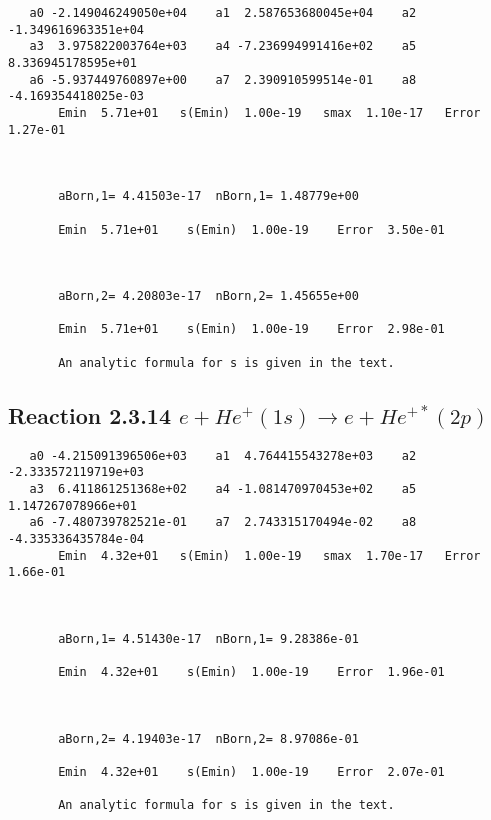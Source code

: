 \documentclass[12pt]{article}
\begin{document}
\begin{small}\begin{verbatim}
   a0 -2.149046249050e+04    a1  2.587653680045e+04    a2 -1.349616963351e+04
   a3  3.975822003764e+03    a4 -7.236994991416e+02    a5  8.336945178595e+01
   a6 -5.937449760897e+00    a7  2.390910599514e-01    a8 -4.169354418025e-03
       Emin  5.71e+01   s(Emin)  1.00e-19   smax  1.10e-17   Error  1.27e-01



       aBorn,1= 4.41503e-17  nBorn,1= 1.48779e+00

       Emin  5.71e+01    s(Emin)  1.00e-19    Error  3.50e-01



       aBorn,2= 4.20803e-17  nBorn,2= 1.45655e+00

       Emin  5.71e+01    s(Emin)  1.00e-19    Error  2.98e-01

       An analytic formula for s is given in the text.
\end{verbatim}\end{small}




\newpage
\subsection{
Reaction 2.3.14 $   e + He^+(1s) \rightarrow e + He^{+*}(2p)$}





\begin{small}\begin{verbatim}
   a0 -4.215091396506e+03    a1  4.764415543278e+03    a2 -2.333572119719e+03
   a3  6.411861251368e+02    a4 -1.081470970453e+02    a5  1.147267078966e+01
   a6 -7.480739782521e-01    a7  2.743315170494e-02    a8 -4.335336435784e-04
       Emin  4.32e+01   s(Emin)  1.00e-19   smax  1.70e-17   Error  1.66e-01



       aBorn,1= 4.51430e-17  nBorn,1= 9.28386e-01

       Emin  4.32e+01    s(Emin)  1.00e-19    Error  1.96e-01



       aBorn,2= 4.19403e-17  nBorn,2= 8.97086e-01

       Emin  4.32e+01    s(Emin)  1.00e-19    Error  2.07e-01

       An analytic formula for s is given in the text.
\end{verbatim}\end{small}
\end{document}
